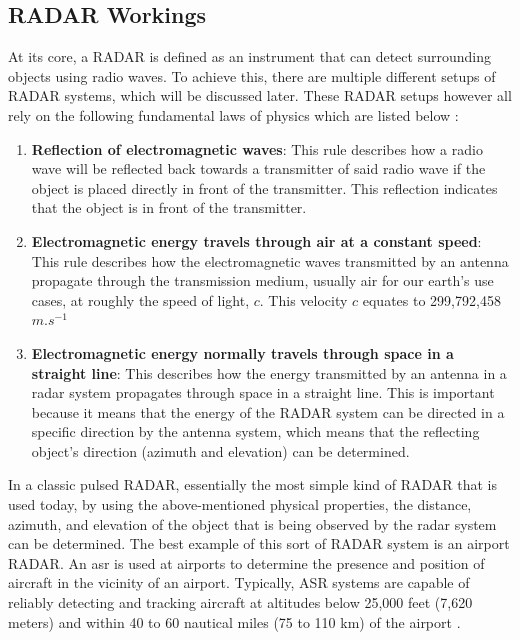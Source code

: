 \documentclass[class=report,11pt,crop=false]{standalone}
\begin{document}
\subsection{RADAR Workings}
At its core, a RADAR is defined as an instrument that can detect surrounding objects using radio waves. To achieve this, there are multiple different setups of RADAR systems, which will be discussed later. These RADAR setups however all rely on the following fundamental laws of physics which are listed below \cite{christian_wolff_physical_2024}:

\begin{enumerate}
    \item \textbf{Reflection of electromagnetic waves}: This rule describes how a radio wave will be reflected back towards a transmitter of said radio wave if the object is placed directly in front of the transmitter. This reflection indicates that the object is in front of the transmitter.
    \item \textbf{Electromagnetic energy travels through air at a constant speed}: This rule describes how the electromagnetic waves transmitted by an antenna propagate through the transmission medium, usually air for our earth's use cases, at roughly the speed of light, $c$. This velocity $c$ equates to 299,792,458 $m.s^{-1}$ 
    \item \textbf{Electromagnetic energy normally travels through space in a straight line}: This describes how the energy transmitted by an antenna in a radar system propagates through space in a straight line. This is important because it means that the energy of the RADAR system can be directed in a specific direction by the antenna system, which means that the reflecting object's direction (azimuth and elevation) can be determined.
\end{enumerate}

In a classic pulsed RADAR, essentially the most simple kind of RADAR that is used today, by using the above-mentioned physical properties, the distance, azimuth, and elevation of the object that is being observed by the radar system can be determined. The best example of this sort of RADAR system is an airport RADAR. An \gls{asr} is used at airports to determine the presence and position of aircraft in the vicinity of an airport. Typically, ASR systems are capable of reliably detecting and tracking aircraft at altitudes below 25,000 feet (7,620 meters) and within 40 to 60 nautical miles (75 to 110 km) of the airport \cite{everythingrf_what_2022}.
\end{document}
